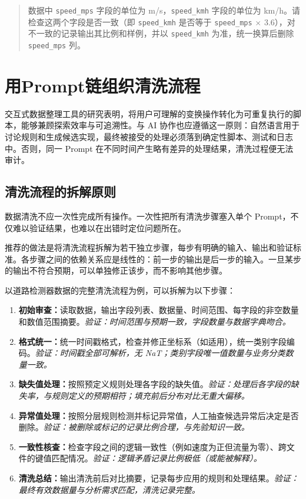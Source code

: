 \begin{quote}
数据中 \texttt{speed\_mps} 字段的单位为 m/s，\texttt{speed\_kmh} 字段的单位为 km/h。请检查这两个字段是否一致（即 \texttt{speed\_kmh} 是否等于 \texttt{speed\_mps} $\times$ 3.6），对不一致的记录输出其比例和样例，并以 \texttt{speed\_kmh} 为准，统一换算后删除 \texttt{speed\_mps} 列。
\end{quote}

\section{用Prompt链组织清洗流程}

交互式数据整理工具的研究表明，将用户可理解的变换操作转化为可重复执行的脚本，能够兼顾探索效率与可追溯性\cite{kandel2011wrangler}。与 AI 协作也应遵循这一原则：自然语言用于讨论规则和生成候选实现，最终被接受的处理必须落到确定性脚本、测试和日志中。否则，同一 Prompt 在不同时间产生略有差异的处理结果，清洗过程便无法审计。

\subsection{清洗流程的拆解原则}

数据清洗不应一次性完成所有操作。一次性把所有清洗步骤塞入单个 Prompt，不仅难以验证结果，也难以在出错时定位问题所在。

推荐的做法是将清洗流程拆解为若干独立步骤，每步有明确的输入、输出和验证标准。各步骤之间的依赖关系应是线性的：前一步的输出是后一步的输入。一旦某步的输出不符合预期，可以单独修正该步，而不影响其他步骤。

以道路检测器数据的完整清洗流程为例，可以拆解为以下步骤：

\begin{enumerate}
  \item \textbf{初始审查：}读取数据，输出字段列表、数据量、时间范围、每字段的非空数量和数值范围摘要。\textit{验证：时间范围与预期一致，字段数量与数据字典吻合。}
  \item \textbf{格式统一：}统一时间戳格式，检查并修正坐标系（如适用），统一类别字段编码。\textit{验证：时间戳全部可解析，无 NaT；类别字段唯一值数量与业务分类数量一致。}
  \item \textbf{缺失值处理：}按照预定义规则处理各字段的缺失值。\textit{验证：处理后各字段的缺失率，与规则定义的预期相符；填充前后分布对比无重大偏移。}
  \item \textbf{异常值处理：}按照分层规则检测并标记异常值，人工抽查候选异常后决定是否删除。\textit{验证：被删除或标记的记录比例合理，与先验知识一致。}
  \item \textbf{一致性核查：}检查字段之间的逻辑一致性（例如速度为正但流量为零）、跨文件的键值匹配情况。\textit{验证：逻辑矛盾记录比例极低（或能被解释）。}
  \item \textbf{清洗总结：}输出清洗前后对比摘要，记录每步应用的规则和处理结果。\textit{验证：最终有效数据量与分析需求匹配，清洗记录完整。}
\end{enumerate}

